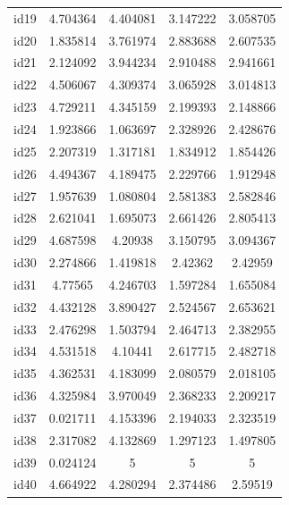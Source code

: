 \documentclass[entropy,article,submit,moreauthors,LaTeX and dvi2pdf]{Definitions/mdpi}
\begin{document}
\begin{center}
\begin{longtable}{ccccc}
id19      & 4.704364  & 4.404081       & 3.147222          & 3.058705          \\
id20      & 1.835814  & 3.761974       & 2.883688          & 2.607535          \\
id21      & 2.124092  & 3.944234       & 2.910488          & 2.941661          \\
id22      & 4.506067  & 4.309374       & 3.065928          & 3.014813          \\
id23      & 4.729211  & 4.345159       & 2.199393          & 2.148866          \\
id24      & 1.923866  & 1.063697       & 2.328926          & 2.428676          \\
id25      & 2.207319  & 1.317181       & 1.834912          & 1.854426          \\
id26      & 4.494367  & 4.189475       & 2.229766          & 1.912948          \\
id27      & 1.957639  & 1.080804       & 2.581383          & 2.582846          \\
id28      & 2.621041  & 1.695073       & 2.661426          & 2.805413          \\
id29      & 4.687598  & 4.20938        & 3.150795          & 3.094367          \\
id30      & 2.274866  & 1.419818       & 2.42362           & 2.42959           \\
id31      & 4.77565   & 4.246703       & 1.597284          & 1.655084          \\
id32      & 4.432128  & 3.890427       & 2.524567          & 2.653621          \\
id33      & 2.476298  & 1.503794       & 2.464713          & 2.382955          \\
id34      & 4.531518  & 4.10441        & 2.617715          & 2.482718          \\
id35      & 4.362531  & 4.183099       & 2.080579          & 2.018105          \\
id36      & 4.325984  & 3.970049       & 2.368233          & 2.209217          \\
id37      & 0.021711  & 4.153396       & 2.194033          & 2.323519          \\
id38      & 2.317082  & 4.132869       & 1.297123          & 1.497805          \\
id39      & 0.024124  & 5              & 5                 & 5                 \\
id40      & 4.664922  & 4.280294       & 2.374486          & 2.59519           \\

\end{longtable}
\end{center}
\end{document}
